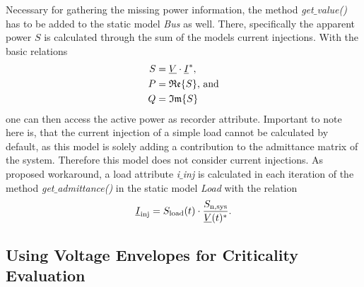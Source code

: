 Necessary for gathering the missing power information, the method \textit{get$\_$value()} has to be added to the static model \textit{Bus} as well.
There, specifically the apparent power $S$ is calculated through the sum of the models current injections.
With the basic relations
\begin{align}
        S&=\underline{V} \cdot \underline{I}^* \notag, \\
        P&=\mathfrak{Re} \{S\}\text{, and} \notag \\
        Q&=\mathfrak{Im} \{S\} \notag
\end{align}
one can then access the active power as recorder attribute. 
Important to note here is, that the current injection of a simple load cannot be calculated by default, as this model is solely adding a contribution to the admittance matrix of the system.
Therefore this model does not consider current injections.
As proposed workaround, a load attribute \textit{i$\_$inj} is calculated in each iteration of the method \textit{get$\_$admittance()} in the static model \textit{Load} with the relation
\begin{align}
        \underline{I}_\mathrm{inj}=S_\mathrm{load}(t) \cdot \frac{S_\mathrm{n,sys}}{\underline{V}(t)^*}. \notag
\end{align}


        
\subsection{Using Voltage Envelopes for Criticality Evaluation}
\label{sec:comb-rating-tool}


